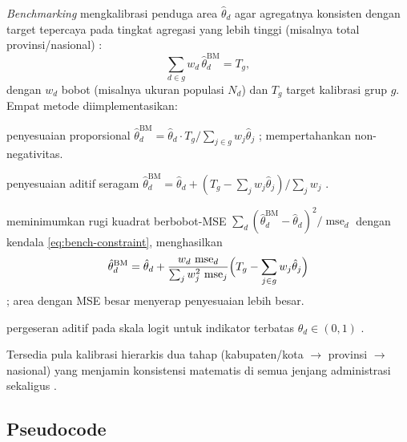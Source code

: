\documentclass[11pt,a4paper]{article}
\theoremstyle{definition}
\begin{document}
\emph{Benchmarking} mengkalibrasi penduga area $\hat{\theta}_d$ agar agregatnya
konsisten dengan target tepercaya pada tingkat agregasi yang lebih tinggi
(misalnya total provinsi/nasional) \cite{rao2015}:
\begin{equation}
  \sum_{d \in g} w_d\,\hat{\theta}_d^{\mathrm{BM}} = T_g,
  \label{eq:bench-constraint}
\end{equation}
dengan $w_d$ bobot (misalnya ukuran populasi $N_d$) dan $T_g$ target kalibrasi
grup $g$. Empat metode diimplementasikan:
\begin{description}[nosep]
  \item[\texttt{"ratio"}:] penyesuaian proporsional
    $\hat{\theta}_d^{\mathrm{BM}} = \hat{\theta}_d \cdot T_g / \sum_{j \in g} w_j\hat{\theta}_j$
    \cite{you2002}; mempertahankan non-negativitas.
  \item[\texttt{"difference"}:] penyesuaian aditif seragam
    $\hat{\theta}_d^{\mathrm{BM}} = \hat{\theta}_d + (T_g - \sum_{j} w_j\hat{\theta}_j)/\sum_j w_j$
    \cite{rao2015}.
  \item[\texttt{"optimal"}:] meminimumkan rugi kuadrat berbobot-MSE
    $\sum_d (\hat{\theta}_d^{\mathrm{BM}} - \hat{\theta}_d)^2 / \operatorname{mse}_d$
    dengan kendala \eqref{eq:bench-constraint}, menghasilkan
    \begin{equation}
      \hat{\theta}_d^{\mathrm{BM}} = \hat{\theta}_d
      + \frac{w_d\,\operatorname{mse}_d}{\sum_j w_j^2\,\operatorname{mse}_j}
        \Bigl(T_g - \sum_{j \in g} w_j\hat{\theta}_j\Bigr)
    \end{equation}
    \cite{datta2011}; area dengan MSE besar menyerap penyesuaian lebih besar.
  \item[\texttt{"logit"}:] pergeseran aditif pada skala logit untuk indikator
    terbatas $\theta_d \in (0,1)$ \cite{berg2014}.
\end{description}
Tersedia pula kalibrasi hierarkis dua tahap (kabupaten/kota $\to$ provinsi $\to$
nasional) yang menjamin konsistensi matematis di semua jenjang administrasi
sekaligus \cite{rao2015,steorts2014}.

\subsection{Pseudocode}
\end{document}

